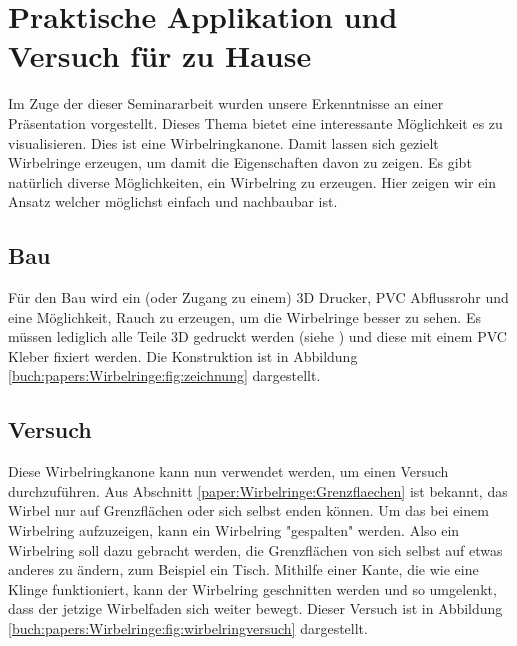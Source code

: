 %
%
%
\section{Praktische Applikation und Versuch für zu Hause}

Im Zuge der dieser Seminararbeit wurden unsere Erkenntnisse an einer Präsentation vorgestellt. 
Dieses Thema bietet eine interessante Möglichkeit es zu visualisieren. 
Dies ist eine Wirbelringkanone. 
Damit lassen sich gezielt Wirbelringe erzeugen, um damit die Eigenschaften davon zu zeigen. 
Es gibt natürlich diverse Möglichkeiten, ein Wirbelring zu erzeugen. 
Hier zeigen wir ein Ansatz welcher möglichst einfach und nachbaubar ist.

\subsection{Bau}


Für den Bau wird ein (oder Zugang zu einem) 3D Drucker,  PVC Abflussrohr und eine Möglichkeit, Rauch zu erzeugen, um die Wirbelringe besser zu sehen. 
Es müssen lediglich alle Teile 3D gedruckt werden (siehe \cite{Wirbelringe:3D_modelle}) und diese mit einem PVC Kleber fixiert werden. 
Die Konstruktion ist in Abbildung \ref{buch:papers:Wirbelringe:fig:zeichnung} dargestellt.

\subsection{Versuch}

Diese Wirbelringkanone kann nun verwendet werden, um einen Versuch durchzuführen. 
Aus Abschnitt \ref{paper:Wirbelringe:Grenzflaechen} ist bekannt, das Wirbel nur auf Grenzflächen oder sich selbst enden können. 
Um das bei einem Wirbelring aufzuzeigen, kann ein Wirbelring "gespalten" werden. 
Also ein Wirbelring soll dazu gebracht werden, die Grenzflächen von sich selbst auf etwas anderes zu ändern, zum Beispiel ein Tisch. 
Mithilfe einer Kante, die wie eine Klinge funktioniert, kann der Wirbelring geschnitten werden und so umgelenkt, dass der jetzige Wirbelfaden sich weiter bewegt. 
Dieser Versuch ist in Abbildung \ref{buch:papers:Wirbelringe:fig:wirbelringversuch} dargestellt.



